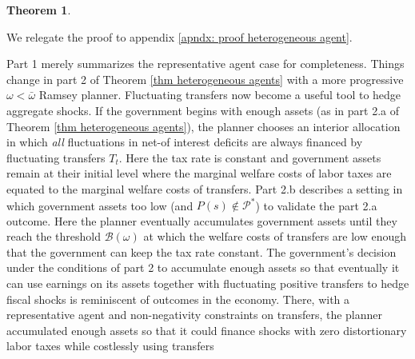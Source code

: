 \documentclass[thmsb,11pt]{article}
\newtheorem{theorem}{Theorem}
\begin{document}
\begin{theorem}
\begin{enumerate}
\begin{enumerate}
\begin{enumerate}


 \end{enumerate}

 \end{enumerate}

 \end{enumerate}


\end{theorem}



We relegate the proof to appendix \ref{apndx: proof heterogeneous agent}. 

\color{black}
 Part 1 merely summarizes the representative agent case for completeness. Things change in part 2  of Theorem \ref{thm heterogeneous agents} with a more progressive  $\omega<\bar{\omega}$ Ramsey planner.
Fluctuating transfers  now become a useful  tool to  hedge aggregate shocks.
  If the government begins with enough assets (as in part 2.a of  Theorem \ref{thm heterogeneous agents}),
   the planner
  chooses an interior allocation in which {\em all} fluctuations in net-of interest deficits are always financed by fluctuating transfers $T_t$.
   Here  the tax rate is  constant and government assets remain at their initial level where %
    the marginal welfare costs of labor taxes are equated
 to the marginal welfare costs of transfers. Part 2.b describes a setting in which  government assets too low (and $P(s)\not \in \mathcal{P}^*$) to validate the part 2.a outcome.  Here the planner eventually accumulates government  assets until they reach the threshold $\mathcal{B}(\omega)$
at which the welfare  costs of transfers are  low enough that the government  can  keep the tax rate constant.
The government's decision under the conditions of part 2  to accumulate enough  assets so that
 eventually it can use earnings on its assets together with fluctuating positive  transfers to hedge fiscal shocks is reminiscent of outcomes in the \cite{Aiyagari2002} economy. There, with a representative agent and non-negativity constraints on transfers, the planner
accumulated enough assets so that it could finance shocks with zero distortionary labor taxes while costlessly using transfers
\end{document}
